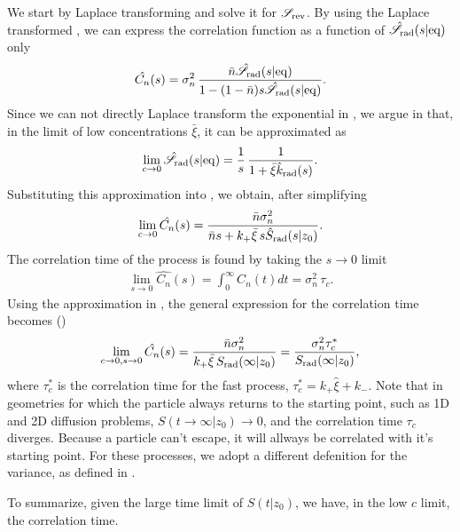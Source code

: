 We start by Laplace transforming  and solve it for $\mathscr{S}_{\rm rev}$. By using the Laplace transformed , we can express the correlation function as a function of $\hat{\mathscr{S}}_{\rm rad}(s|{\rm eq})$ only
\begin{equation}
 \hat{C_n}(s) = \sigma_n^2 \, \frac{\bar{n} \hat{\mathscr{S}}_{\rm rad}(s|{\rm eq})}{1-(1-\bar{n})s\hat{\mathscr{S}}_{\rm rad}(s|{\rm eq})}.
 \elabel{LapCorr}
\end{equation}
Since we can not directly Laplace transform the exponential in , we argue in  that, in the limit of low concentrations $\bar{\xi}$, it can be approximated as
\begin{equation}
 \lim_{c\to0} \hat{\mathscr{S}}_{\rm rad}(s|{\rm eq}) = \frac{1}{s}  \, \frac{1}{ 1 + \bar{\xi} \hat{k}_{\rm rad}(s)}.
 \elabel{Seq_approx}
\end{equation}
Substituting this approximation into , we obtain, after simplifying
\begin{equation}
 \lim_{c \to 0} \hat{C_n}(s) = \frac{\bar{n} \sigma_n^2}{\bar{n} s + k_+ \bar{\xi} \, s \hat{S}_{\rm rad}(s|z_0)}.
 \elabel{Corr_approx}
\end{equation}
The correlation time of the process is found by taking the $s \to 0$ limit
\begin{eqnarray}
 \lim_{s \to 0} \hat{C_n}(s) = \int_0^\infty C_n(t) dt = \sigma_n^2 \, \tau_c.
\end{eqnarray}
Using the approximation in , the general expression for the correlation time becomes ()
\begin{equation}
 \lim_{c \to 0, s \to 0} \hat{C_n}(s) = \frac{\bar{n} \sigma_n^2}{k_+ \bar{\xi} \, S_{\rm rad}(\infty|z_0)} = \frac{\sigma_n^2 \tau_c^*}{S_{\rm rad}(\infty|z_0)},
 \elabel{CT1}
\end{equation}
where $\tau_c^*$ is the correlation time for the fast process, $\tau_c^* = k_+ \hat{\xi} + k_-$. Note that in geometries for which the particle always returns to the starting point, such as 1D and 2D diffusion problems, $S(t\to\infty|z_0)\to0$, and the correlation time $\tau_c$ diverges. Because a particle can't escape, it will allways be correlated with it's starting point. For these processes, we adopt a different defenition for the variance, as defined in .

To summarize, given the large time limit of $S(t|z_0)$, we have, in the low $c$ limit, the correlation time.


